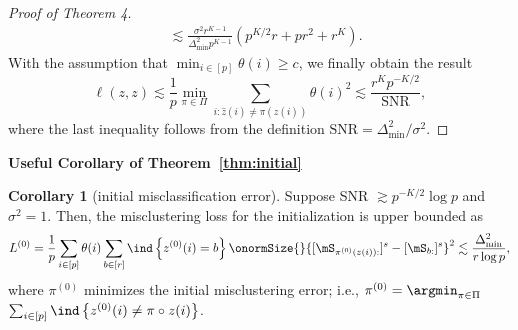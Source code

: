 \documentclass[lettersize,onecolumn,journal]{IEEEtran}
\theoremstyle{definition}
\newtheorem{cor}{Corollary}
\theoremstyle{definition}
\newcommand{\of}[1]{\left(#1\right)}
\newcommand{\offf}[1]{\left\{#1\right\}}
\begin{document}
\begin{proof}[Proof of Theorem 4]
\begin{align}
        & \lesssim \frac{\sigma^2 r^{K-1}}{ \Delta_{\min}^2  p^{K-1} } \of{ p^{K/2}r + pr^2 + r^K }.
    \end{align}
    With the assumption that $\min_{i \in [p]} \theta(i) \geq c$, we finally obtain the result
    \begin{equation}
        \ell(z, z) \lesssim \frac{1}{p}\min_{\pi \in \Pi} \sum_{i : \hat z(i) \neq \pi(z(i))} \theta(i)^2 \lesssim \frac{r^K p^{-K/2} }{ \text{SNR} },
    \end{equation}
    where the last inequality follows from the definition $\text{SNR} = \Delta_{\min}^2/\sigma^2$.
\end{proof}

{\bf Useful Corollary of Theorem~\ref{thm:initial}} 

\begin{cor}[initial misclassification error]\label{cor:L0} 
Suppose SNR $\gtrsim p^{-K/2} \log p$ and  $\sigma^2 = 1$. Then, the misclustering loss for the initialization is upper bounded as 
\begin{equation}
    L^{(0)} =  \frac{1}{p}  \sum_{i \in [p]} \theta(i) \sum_{b \in [r]}  \ind \offf{ z^{(0)}(i) = b } \onormSize{}{ [ \mS_{ \pi^{(0)}( z(i)):}  ]^s - [ \mS_{b:}  ]^s  }^2 \lesssim \frac{\Delta_{\min}^2}{r \log p},
\end{equation}
where $\pi^{(0)}$ minimizes the initial misclustering error; i.e., $\pi^{(0)} = \argmin_{\pi \in \Pi} $ $ \sum_{i \in [p]}\ind \offf{z^{(0)}(i) \neq \pi \circ z(i) }$.
\end{cor}
\end{document}
